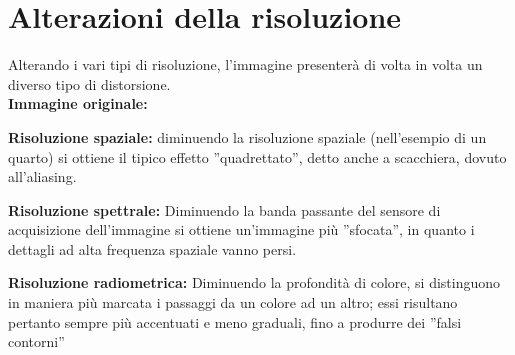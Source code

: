\section{Alterazioni della risoluzione}
Alterando i vari tipi di risoluzione, l’immagine presenterà di volta in volta un
diverso tipo di distorsione. \\ \textbf{Immagine originale:}
\begin{trivlist}
    \item \textbf{Risoluzione spaziale:} diminuendo la risoluzione spaziale
    (nell’esempio di un quarto) si ottiene il tipico effetto ”quadrettato”,
    detto anche a scacchiera, dovuto all’aliasing.
    \item \textbf{Risoluzione spettrale:} Diminuendo la banda passante del
    sensore di acquisizione dell’immagine si ottiene un’immagine più ”sfocata”,
    in quanto i dettagli ad alta frequenza spaziale vanno persi.
    \item \textbf{Risoluzione radiometrica:} Diminuendo la profondità di colore,
    si distinguono in maniera più marcata i passaggi da un colore ad un altro;
    essi risultano pertanto sempre più accentuati e meno graduali, fino a
    produrre dei ”falsi contorni”
\end{trivlist}

